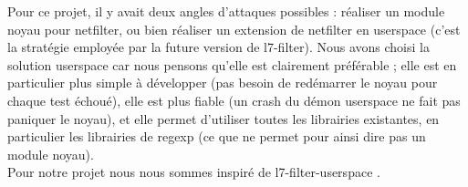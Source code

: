 Pour ce projet, il y avait deux angles d'attaques possibles : réaliser un module noyau pour netfilter, ou bien réaliser un extension de netfilter en userspace (c'est la stratégie employée par la future version de l7-filter).
Nous avons choisi la solution userspace car nous pensons qu'elle est clairement préférable ; elle est en particulier plus simple à développer (pas besoin de
redémarrer le noyau pour chaque test échoué), elle est plus fiable (un
crash du démon userspace ne fait pas paniquer le noyau), et elle
permet d'utiliser toutes les librairies existantes, en particulier les
librairies de regexp (ce que ne permet pour ainsi dire pas un module
noyau).\\

Pour notre projet nous nous sommes inspiré de l7-filter-userspace \cite{RW}.